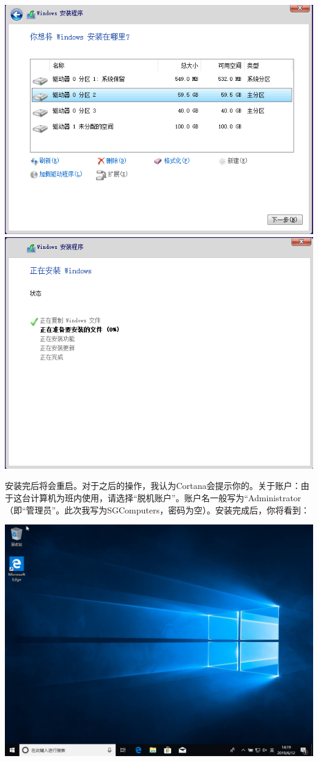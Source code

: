 \documentclass{book}
\begin{document}
\begin{center}
	\includegraphics[scale=0.45]{pic/win10setup6}	\includegraphics[scale=0.45]{pic/win10setup7}
\end{center}
安装完后将会重启。{\color{red}{注意，弹出光盘！}}对于之后的操作，我认为Cortana会提示你的。关于账户：由于这台计算机为班内使用，请选择“脱机账户”。账户名一般写为“Administrator（即“管理员”。此次我写为SGComputers，密码为空）。安装完成后，你将看到：
\begin{center}
	\includegraphics[scale=0.4]{pic/win10setup8}
\end{center}
\end{document}
